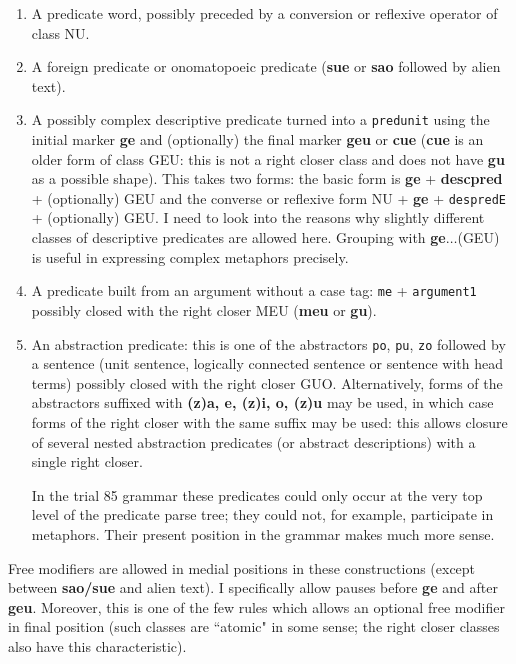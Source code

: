 \documentclass[12pt]{book}
\begin{document}
\begin{enumerate}

\item  A predicate word, possibly preceded by a conversion or reflexive operator of class NU.

\item  A foreign predicate or onomatopoeic predicate ({\bf sue} or {\bf sao} followed by alien text).

\item A possibly complex descriptive predicate turned into a {\tt predunit} using the initial marker {\bf ge} and (optionally) the final marker {\bf geu} or {\bf cue} ({\bf cue} is an older form of class GEU:  this is not a right closer class and does not have {\bf gu} as a possible shape).  This takes two forms:  the basic form is {\bf ge} + {\bf descpred} + (optionally) GEU and
the converse or reflexive form NU + {\bf ge} + {\tt despredE} + (optionally) GEU.  I need to look into the reasons why slightly different classes
of descriptive predicates are allowed here.  Grouping with {\bf ge}$\ldots$(GEU) is useful in expressing complex metaphors precisely.

\item A predicate built from an argument without a case tag:  {\tt me} + {\tt argument1} possibly closed with the right closer MEU ({\bf meu} or {\bf gu}).

\item An abstraction predicate:  this is one of the abstractors {\tt po}, {\tt pu}, {\tt zo} followed by a sentence (unit sentence, logically connected sentence or sentence with head terms) possibly closed with the right closer GUO.  Alternatively, forms of the abstractors suffixed with 
{\bf (z)a, e, (z)i, o, (z)u} may be used, in which case forms of the right closer with the same suffix may be used:  this allows closure of several nested abstraction predicates (or abstract descriptions) with a single right closer.

In the trial 85 grammar these predicates could only occur at the very top level of the predicate parse tree;  they could not, for example, participate in metaphors.   Their present position in the grammar makes much more sense.

\end{enumerate}

Free modifiers are allowed in medial positions in these constructions (except between {\bf sao/sue} and alien text).  I specifically allow pauses before {\bf ge} and after {\bf geu}.  Moreover, this is
one of the few rules which allows an optional free modifier in final position (such classes are ``atomic" in some sense; the right closer classes also have this characteristic).
\end{document}
